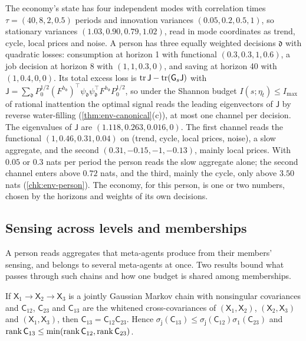 \begin{example}\label{ex:env-person}
The economy's state has four independent modes with correlation times $\tau=(40,8,2,0.5)$ periods and innovation variances $(0.05,0.2,0.5,1)$, so stationary variances $(1.03,0.90,0.79,1.02)$, read in mode coordinates as trend, cycle, local prices and noise. A person has three equally weighted decisions $\mathfrak d$ with quadratic losses: consumption at horizon 1 with functional $(0.3,0.3,1,0.6)$, a job decision at horizon 8 with $(1,1,0.3,0)$, and saving at horizon 40 with $(1,0.4,0,0)$. Its total excess loss is $\operatorname{tr}\mathsf J-\operatorname{tr}(\mathsf G_s\mathsf J)$ with $\mathsf J=\sum_{\mathfrak d}P_0^{1/2}(F^{h_{\mathfrak d}})^\top\psi_{\mathfrak d}\psi_{\mathfrak d}^\top F^{h_{\mathfrak d}}P_0^{1/2}$, so under the Shannon budget $I(s;\eta_t)\le I_{\max}$ of rational inattention the optimal signal reads the leading eigenvectors of $\mathsf J$ by reverse water-filling (\cref{thm:env-canonical}(c)), at most one channel per decision. The eigenvalues of $\mathsf J$ are $(1.118,0.263,0.016,0)$. The first channel reads the functional $(1,0.46,0.31,0.04)$ on (trend, cycle, local prices, noise), a slow aggregate, and the second $(0.31,-0.15,-1,-0.13)$, mainly local prices. With $0.05$ or $0.3$ nats per period the person reads the slow aggregate alone; the second channel enters above $0.72$ nats, and the third, mainly the cycle, only above $3.50$ nats (\cref{chk:env-person}). The economy, for this person, is one or two numbers, chosen by the horizons and weights of its own decisions.
\end{example}

\subsection{Sensing across levels and memberships}\label{sec:env-levels}

A person reads aggregates that meta-agents produce from their members' sensing, and belongs to several meta-agents at once. Two results bound what passes through such chains and how one budget is shared among memberships.

\begin{lemma}\label{lem:env-composition}
If $\mathsf X_1\to\mathsf X_2\to\mathsf X_3$ is a jointly Gaussian Markov chain with nonsingular covariances and $\mathsf C_{12}$, $\mathsf C_{23}$ and $\mathsf C_{13}$ are the whitened cross-covariances of $(\mathsf X_1,\mathsf X_2)$, $(\mathsf X_2,\mathsf X_3)$ and $(\mathsf X_1,\mathsf X_3)$, then $\mathsf C_{13}=\mathsf C_{12}\mathsf C_{23}$. Hence $\sigma_{\mathsf j}(\mathsf C_{13})\le\sigma_{\mathsf j}(\mathsf C_{12})\sigma_1(\mathsf C_{23})$ and $\operatorname{rank}\mathsf C_{13}\le\min(\operatorname{rank}\mathsf C_{12},\operatorname{rank}\mathsf C_{23})$.
\end{lemma}

